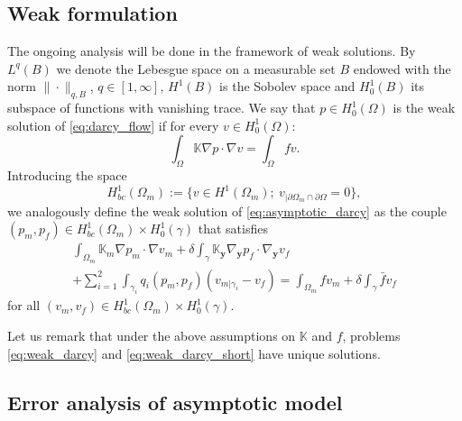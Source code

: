 \documentclass{llncs}
\def\vc#1{\mathbf{\boldsymbol{#1}}}     %
\def\tn#1{{\mathbb{#1}}}    %
\def\norm#1{\|#1\|}
\def\yy{{\vc y}}
\begin{document}
\subsection{Weak formulation}

The ongoing analysis will be done in the framework of weak solutions.
By $L^q(B)$ we denote the Lebesgue space on a measurable set $B$ endowed with the norm $\norm{\cdot}_{q,B}$, $q\in[1,\infty]$, $H^1(B)$ is the Sobolev space and $H^1_0(B)$ its subspace of functions with vanishing trace.
We say that $p\in H^1_0(\Omega)$ is the weak solution of \eqref{eq:darcy_flow} if for every $v\in H^1_0(\Omega)$:
\begin{equation}
\label{eq:weak_darcy}
\int_\Omega \tn K\nabla p\cdot\nabla v = \int_\Omega f v.
\end{equation}
Introducing the space
\[ H^1_{bc}(\Omega_m) := \{v\in H^1(\Omega_m);~v_{|\partial\Omega_m\cap\partial\Omega}=0\}, \]
we analogously define the weak solution of \eqref{eq:asymptotic_darcy} as the couple $(p_m,p_f)\in H^1_{bc}(\Omega_m)\times H^1_0(\gamma)$ that satisfies
\begin{multline}
\label{eq:weak_darcy_short}
\int_{\Omega_m}\tn K_m\nabla p_m\cdot\nabla v_m
+\delta\int_{\gamma}\tn K_\yy\nabla_\yy p_f\cdot\nabla_\yy v_f\\
+ \sum_{i=1}^2\int_{\gamma_i} q_i(p_m,p_f)(v_{m|\gamma_i} - v_f)
 = \int_{\Omega_m} f v_m + \delta\int_\gamma\bar f v_f
\end{multline}
for all $(v_m,v_f)\in H^1_{bc}(\Omega_m)\times H^1_0(\gamma)$.

Let us remark that under the above assumptions on $\tn K$ and $f$, problems \eqref{eq:weak_darcy} and \eqref{eq:weak_darcy_short} have unique solutions.



\subsection{Error analysis of asymptotic model}
\label{sc:error_estimate}
\end{document}
